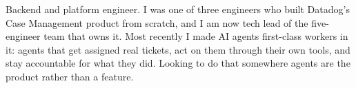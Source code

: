 

\begin{cvparagraph}

Backend and platform engineer. I was one of three engineers who built Datadog's Case Management product from scratch, and I am now tech lead of the five-engineer team that owns it. Most recently I made AI agents first-class workers in it: agents that get assigned real tickets, act on them through their own tools, and stay accountable for what they did. Looking to do that somewhere agents are the product rather than a feature.

\end{cvparagraph}
